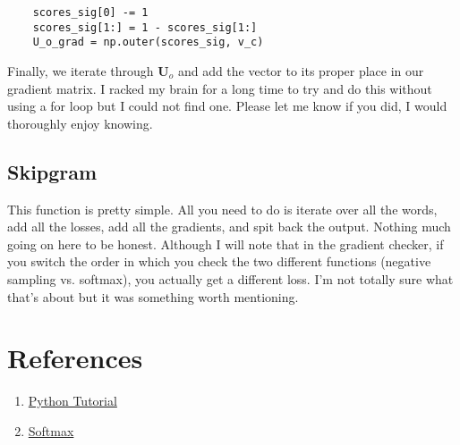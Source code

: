 \documentclass[12pt]{article}
\begin{document}
\begin{verbatim}
    scores_sig[0] -= 1
    scores_sig[1:] = 1 - scores_sig[1:]
    U_o_grad = np.outer(scores_sig, v_c)
\end{verbatim}
Finally, we iterate through $\bm U_o$ and add the vector to its proper place in our 
gradient matrix. I racked my brain for a long time to try and do this without using 
a for loop but I could not find one. Please let me know if you did, I would thoroughly 
enjoy knowing. 

\subsection{Skipgram}
This function is pretty simple. All you need to do is iterate over all the words, add 
all the losses, add all the gradients, and spit back the output. Nothing much going on 
here to be honest. Although I will note that in the gradient checker, if you switch 
the order in which you check the two different functions (negative sampling vs. softmax), 
you actually get a different loss. I'm not totally sure what that's about but it was something 
worth mentioning. 


\section{References}
\begin{enumerate}
    \item \href{https://cs231n.github.io/python-numpy-tutorial/}{Python Tutorial}
    \item \href{https://cs231n.github.io/linear-classify/#softmax-classifier}{Softmax}
\end{enumerate}
\end{document}
